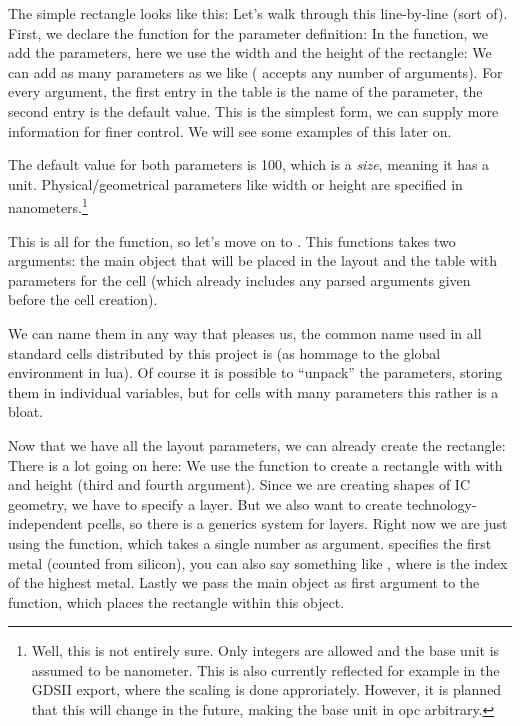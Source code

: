The simple rectangle looks like this:
Let's walk through this line-by-line (sort of). First, we declare the function for the parameter definition:
In the function, we add the parameters, here we use the width and the height of the rectangle:
We can add as many parameters as we like ( accepts any number of arguments). For every argument, the first entry in the table is
the name of the parameter, the second entry is the default value. This is the simplest form, we can supply more information for finer control. We will see some
examples of this later on.

The default value for both parameters is 100, which is a \emph{size}, meaning it has a unit. Physical/geometrical parameters like width or height are specified
in nanometers.\footnote{Well, this is not entirely sure. Only integers are allowed and the base unit is assumed to be nanometer. This is also
currently reflected for example in the GDSII export, where the scaling is done approriately. However, it is planned that this will change in the
future, making the base unit in opc arbitrary.}

This is all for the  function, so let's move on to . This functions takes two arguments: the main object that will be
placed in the layout and the table with parameters for the cell (which already includes any parsed arguments given before the cell creation).

We can name them in any way that pleases us, the common name used in all standard cells distributed by this project is  (as hommage to the global
environment  in lua).
Of course it is possible to \enquote{unpack} the parameters, storing them in individual variables, but for cells with many parameters this rather is a bloat.

Now that we have all the layout parameters, we can already create the rectangle:
There is a lot going on here: We use the  function to create a rectangle with with and height (third and fourth argument).
Since we are creating shapes of IC geometry, we have to specify a layer.
But we also want to create technology-independent pcells, so there is a generics system for layers.
Right now we are just using the  function, which takes a single number as argument.
 specifies the first metal (counted from silicon), you can also say something like , where  is the index of the highest metal.
Lastly we pass the main object as first argument to the function, which places the rectangle within this object.

